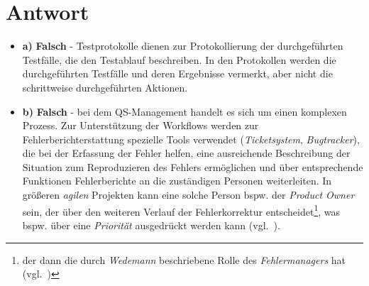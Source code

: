 
\section*{Antwort}

\begin{itemize}
    \item \textbf{a)} \textbf{Falsch} - Testprotokolle dienen zur Protokollierung der durchgeführten Testfälle, die den Testablauf beschreiben.
    In den Protokollen werden die durchgeführten Testfälle und deren Ergebnisse vermerkt, aber nicht die schrittweise durchgeführten Aktionen.
    \item \textbf{b)} \textbf{Falsch} - bei dem QS-Management handelt es sich um einen komplexen Prozess.
Zur Unterstützung der Workflows werden zur Fehlerberichterstattung  spezielle Tools verwendet (\textit{Ticketsystem}, \textit{Bugtracker}), die bei der Erfassung der Fehler helfen, eine ausreichende Beschreibung der Situation zum Reproduzieren des Fehlers ermöglichen und über entsprechende Funktionen Fehlerberichte an die zuständigen Personen weiterleiten.
In größeren \textit{agilen} Projekten kann eine solche Person bspw. der \textit{Product Owner} sein, der über den weiteren Verlauf der Fehlerkorrektur entscheidet\footnote{
    der dann die durch \textit{Wedemann} beschriebene Rolle des \textit{Fehlermanagers} hat (vgl.~\cite[75]{Wed09c})
}, was bspw. über eine \textit{Priorität} ausgedrückt werden kann (vgl.~\cite[108]{Pic08}).

\end{itemize}